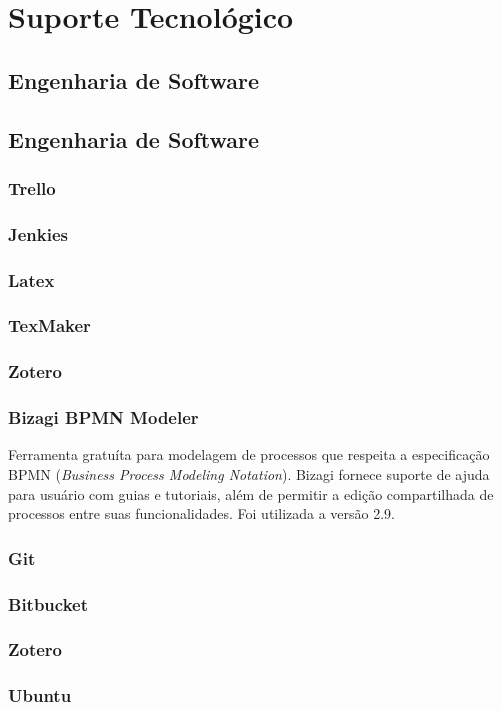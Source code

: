 \chapter[Suporte Tecnologico]{Suporte Tecnológico}

\section{Engenharia de Software}

\section{Engenharia de Software}


\subsection{Trello} 
\subsection{Jenkies}
\subsection{Latex}

\subsection{TexMaker}
\subsection{Zotero}


\subsection{Bizagi BPMN Modeler}
Ferramenta gratuíta para modelagem de processos que respeita a especificação BPMN (\textit{Business Process Modeling Notation}). Bizagi fornece suporte de ajuda para usuário com guias e tutoriais, além de permitir a edição compartilhada de processos entre suas funcionalidades. Foi utilizada a versão 2.9.

\subsection{Git}
\subsection{Bitbucket}
\subsection{Zotero}
\subsection{Ubuntu}